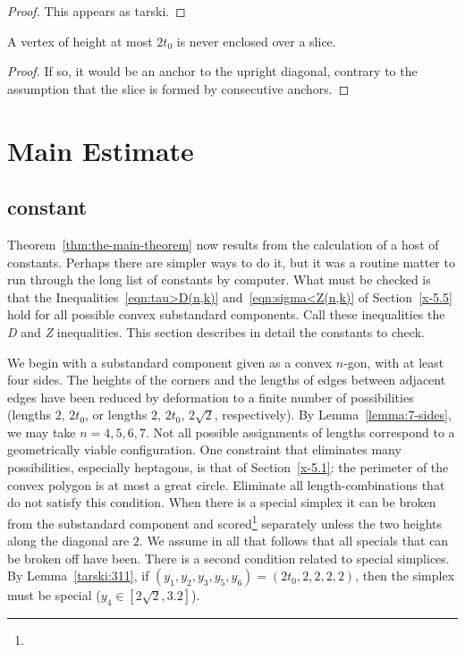\begin{proof}
This appears as tarski.
\end{proof}


\begin{corollary}
A vertex of height at most $2t_0$ is never enclosed over a slice.
\end{corollary}

\begin{proof}  If so, it would be an anchor to the upright diagonal, contrary to
the assumption that the slice is formed by consecutive
anchors.
\end{proof}


\section{Main Estimate}

\subsection{constant} %

Theorem~\ref{thm:the-main-theorem} now results from the calculation of a
host of constants. Perhaps there are simpler ways to do it, but it was a
routine matter to run through the long list of constants by computer.
What must be checked is that the Inequalities~\ref{eqn:tau>D(n,k)}
and~\ref{eqn:sigma<Z(n,k)} of Section~\ref{x-5.5} hold for all possible
convex substandard components. Call these inequalities the {\it D} and {\it Z}
inequalities.  This section describes in detail the constants to check.

We begin with a substandard component given as a convex $n$-gon, with at least
four sides.   The heights of the corners and the lengths of edges
between adjacent edges have been reduced by deformation to a finite
number of possibilities (lengths $2$, $2t_0$, or lengths $2$,
$2t_0$, $2\sqrt{2}$, respectively). By Lemma~\ref{lemma:7-sides}, we
may take $n=4,5,6,7$. Not all possible assignments of lengths
correspond to a geometrically viable configuration. One constraint
that eliminates many possibilities, especially heptagons, is that of
Section~\ref{x-5.1}: the perimeter of the convex polygon is at most
a great circle.  Eliminate all length-combinations that do not
satisfy this condition.  When there is a special simplex it can be
broken
from the substandard component and scored\footnote{} %
separately unless the two heights along the diagonal are $2$.
We assume in all that follows that all specials that can be
broken off have been. There is a second condition related to special
simplices.  By Lemma~\ref{tarski:311}, if
$(y_1,y_2,y_3,y_5,y_6)= (2t_0,2,2,2,2)$, then
the simplex must be special
($y_4\in[2\sqrt{2},3.2]$).


